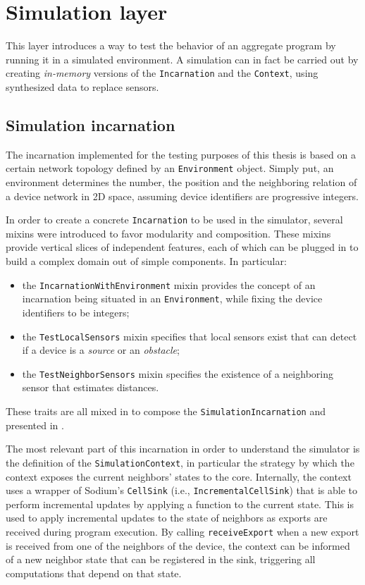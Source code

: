 \section{Simulation layer}

This layer introduces a way to test the behavior of an aggregate program by running it in a simulated environment.
%
A simulation can in fact be carried out by creating \textit{in-memory} versions of the \texttt{Incarnation} and the \texttt{Context}, using synthesized data to replace sensors.

\subsection{Simulation incarnation}

The incarnation implemented for the testing purposes of this thesis is based on a certain network topology defined by an \texttt{Environment} object.
%
Simply put, an environment determines the number, the position and the neighboring relation of a device network in 2D space, assuming device identifiers are progressive integers.

In order to create a concrete \texttt{Incarnation} to be used in the simulator, several mixins were introduced to favor modularity and composition.
%
These mixins provide vertical slices of independent features, each of which can be plugged in to build a complex domain out of simple components.
%
In particular:
%
\begin{itemize}
	\item the \texttt{IncarnationWithEnvironment} mixin provides the concept of an incarnation being situated in an \texttt{Environment}, while fixing the device identifiers to be integers;
	\item the \texttt{TestLocalSensors} mixin specifies that local sensors exist that can detect if a device is a \textit{source} or an \textit{obstacle};
	\item the \texttt{TestNeighborSensors} mixin specifies the existence of a neighboring sensor that estimates distances.
\end{itemize}
%
These traits are all mixed in to compose the \texttt{SimulationIncarnation} and presented in .
%

%
The most relevant part of this incarnation in order to understand the simulator is the definition of the \texttt{SimulationContext}, in particular the strategy by which the context exposes the current neighbors' states to the core.
%
Internally, the context uses a wrapper of Sodium's \texttt{CellSink} (i.e., \texttt{IncrementalCellSink}) that is able to perform incremental updates by applying a function to the current state.
%
This is used to apply incremental updates to the state of neighbors as exports are received during program execution.
%
By calling \texttt{receiveExport} when a new export is received from one of the neighbors of the device, the context can be informed of a new neighbor state that can be registered in the sink, triggering all computations that depend on that state.

